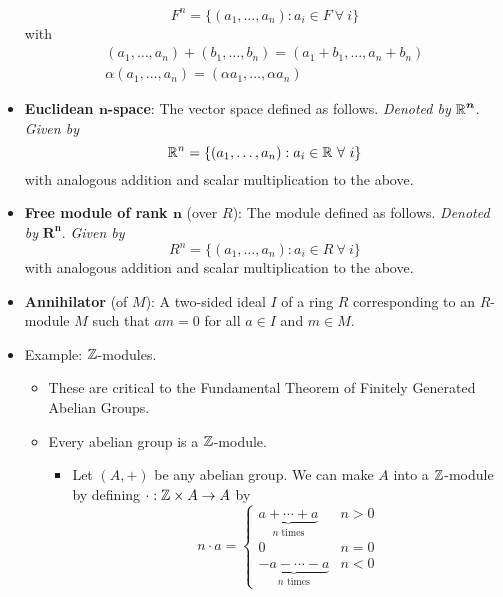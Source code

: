 \documentclass[../notes.tex]{subfiles}
\begin{document}
\begin{itemize}
\begin{equation*}
        F^n = \{(a_1,\dots,a_n):a_i\in F\ \forall\ i\}
    \end{equation*}
    with
    \begin{gather*}
        (a_1,\dots,a_n)+(b_1,\dots,b_n) = (a_1+b_1,\dots,a_n+b_n)\\
        \alpha(a_1,\dots,a_n) = (\alpha a_1,\dots,\alpha a_n)
    \end{gather*}
    \item \textbf{Euclidean $\bm{n}$-space}: The vector space defined as follows. \emph{Denoted by} $\bm{\mathbb{R}^n}$. \emph{Given by}
    \begin{equation*}
        \R^n = \{(a_1,\dots,a_n):a_i\in\R\ \forall\ i\}
    \end{equation*}
    with analogous addition and scalar multiplication to the above.
    \item \textbf{Free module of rank $\bm{n}$} (over $R$): The module defined as follows. \emph{Denoted by} $\bm{R^n}$. \emph{Given by}
    \begin{equation*}
        R^n = \{(a_1,\dots,a_n):a_i\in R\ \forall\ i\}
    \end{equation*}
    with analogous addition and scalar multiplication to the above.
    \item \textbf{Annihilator} (of $M$): A two-sided ideal $I$ of a ring $R$ corresponding to an $R$-module $M$ such that $am=0$ for all $a\in I$ and $m\in M$.
    \item {}Example: $\mathbb{Z}$-modules.
    \begin{itemize}
        \item These are critical to the Fundamental Theorem of Finitely Generated Abelian Groups.
        \item Every abelian group is a $\mathbb{Z}$-module.
        \begin{itemize}
            \item Let $(A,+)$ be any abelian group. We can make $A$ into a $\mathbb{Z}$-module by defining $\cdot:\mathbb{Z}\times A\to A$ by
            \begin{equation*}
                n\cdot a =
                \begin{cases}
                    \underbrace{a+\cdots+a}_{n\text{ times}} & n>0\\
                    0 & n=0\\
                    \underbrace{-a-\cdots-a}_{n\text{ times}} & n<0
                \end{cases}
            \end{equation*}

\end{itemize}
\end{itemize}
\end{itemize}
\end{document}
